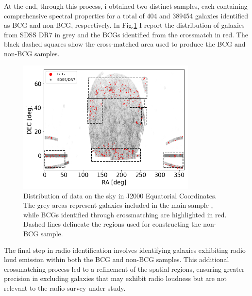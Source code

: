 At the end, through this process, i obtained two distinct samples, each containing comprehensive spectral properties for a total of 404 and 389454 galaxies identified as BCG and non-BCG, respectively. 
In Fig.\ref{Cross:SDSS/C4} I report the distribution of galaxies from SDSS DR7 in grey and the BCGs identified from the crossmatch in red. The black dashed squares show the cross-matched area used to produce the BCG and non-BCG samples.

\begin{figure}[hbtp]
  \centering
  \includegraphics[width=0.8\textwidth]{BCGcmSDSS}
  \caption{Distribution of data on the sky in J2000 Equatorial Coordinates. The grey areas represent galaxies included in the main sample \cite{mpa-sdss-dr7}, while BCGs identified through crossmatching are highlighted in red. Dashed lines delineate the regions used for constructing the non-BCG sample. }
  \label{Cross:SDSS/C4}
\end{figure}

The final step in radio identification involves identifying galaxies exhibiting radio loud emission within both the BCG and non-BCG samples. This additional crossmatching process led to a refinement of the spatial regions, ensuring greater precision in excluding galaxies that may exhibit radio loudness but are not relevant to the radio survey under study.



